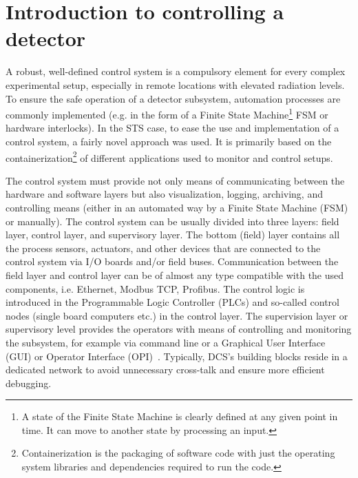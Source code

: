 \section{Introduction to controlling a detector}
A robust, well-defined control system is a compulsory element for every complex experimental setup, especially in remote locations with elevated radiation levels. To ensure the safe operation of a detector subsystem, automation processes are commonly implemented (e.g. in the form of a Finite State Machine\footnote{A state of the Finite State Machine is clearly defined at any given point in time. It can move to another state by processing an input.} \gls{FSM} or hardware interlocks). In the \gls{STS} case, to ease the use and implementation of a control system, a fairly novel approach was used. It is primarily based on the containerization\footnote{Containerization is the packaging of software code with just the operating system libraries and dependencies required to run the code.} of different applications used to monitor and control setups. 




The control system must provide not only means of communicating between the hardware and software layers but also visualization, logging, archiving, and controlling means (either in an automated way by a Finite State Machine (\gls{FSM}) or manually). The control system can be usually divided into three layers: field layer, control layer, and supervisory layer. The bottom (field) layer contains all the process sensors, actuators, and other devices that are connected to the control system via I/O boards and/or field buses. Communication between the field layer and control layer can be of almost any type compatible with the used components, i.e. Ethernet, Modbus \gls{TCP}, Profibus. The control logic is introduced in the Programmable Logic Controller (\glspl{PLC}) and so-called control nodes (single board computers etc.) in the control layer. The supervision layer or supervisory level provides the operators with means of controlling and monitoring the subsystem, for example via command line or a Graphical User Interface (\gls{GUI}) or Operator Interface (\gls{OPI})~\cite{layers}.  Typically, DCS's building blocks reside in a dedicated network to avoid unnecessary cross-talk and ensure more efficient debugging.

